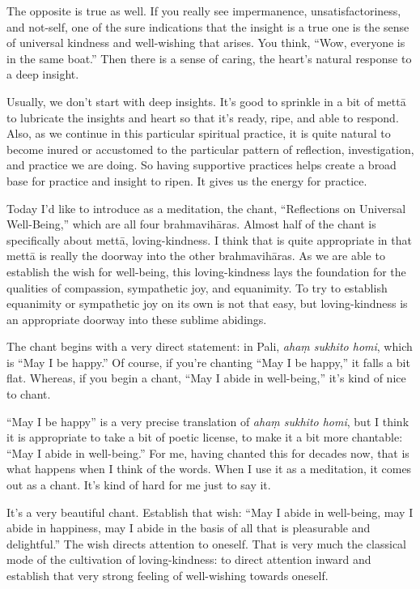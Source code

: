 The opposite is true as well. If you really see impermanence,
unsatisfactoriness, and not-self, one of the sure indications that the
insight is a true one is the sense of universal kindness and
well-wishing that arises. You think, “Wow, everyone is in the same
boat.” Then there is a sense of caring, the heart’s natural response to
a deep insight.

Usually, we don’t start with deep insights. It’s good to sprinkle in a
bit of mettā to lubricate the insights and heart so that it’s ready,
ripe, and able to respond. Also, as we continue in this particular
spiritual practice, it is quite natural to become inured or accustomed
to the particular pattern of reflection, investigation, and practice we
are doing. So having supportive practices helps create a broad base for
practice and insight to ripen. It gives us the energy for practice.

Today I’d like to introduce as a meditation, the chant, “Reflections on
Universal Well-Being,” which are all four brahmavihāras. Almost half of
the chant is specifically about mettā, loving-kindness. I think that is
quite appropriate in that mettā is really the doorway into the other
brahmavihāras. As we are able to establish the wish for well-being, this
loving-kindness lays the foundation for the qualities of compassion,
sympathetic joy, and equanimity. To try to establish equanimity or
sympathetic joy on its own is not that easy, but loving-kindness is an
appropriate doorway into these sublime abidings.

The chant begins with a very direct statement: in Pali, \emph{ahaṃ
sukhito homi}, which is “May I be happy.” Of course, if you’re chanting
“May I be happy,” it falls a bit flat. Whereas, if you begin a chant,
“May I abide in well-being,” it’s kind of nice to chant.

“May I be happy” is a very precise translation of \emph{ahaṃ sukhito
homi}, but I think it is appropriate to take a bit of poetic license, to
make it a bit more chantable: “May I abide in well-being.” For me,
having chanted this for decades now, that is what happens when I think
of the words. When I use it as a meditation, it comes out as a chant.
It’s kind of hard for me just to say it.

It’s a very beautiful chant. Establish that wish: “May I abide in
well-being, may I abide in happiness, may I abide in the basis of all
that is pleasurable and delightful.” The wish directs attention to
oneself. That is very much the classical mode of the cultivation of
loving-kindness: to direct attention inward and establish that very
strong feeling of well-wishing towards oneself.

